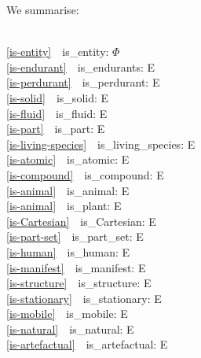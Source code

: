       
We summarise\footnotemark:

\sf
\begin{multicols}{3}\small
\bp
{}\\
\cref{is-entity}\ \ is\_entity: $\Phi$ {\RIGHTARROW}  \\
\cref{is-endurant}\ \ is\_endurants: E {\RIGHTARROW}  \\
\cref{is-perdurant}\ \ is\_perdurant: E {\RIGHTARROW}  \\
\cref{is-solid}\ \ is\_solid: E {\RIGHTARROW}  \\
\cref{is-fluid}\ \ is\_fluid: E {\RIGHTARROW}  \\
\cref{is-part}\ \ is\_part: E {\RIGHTARROW}  \\
\cref{is-living-species}\ \ is\_living\_species: E {\RIGHTARROW}  \\
\cref{is-atomic}\ \ is\_atomic: E {\RIGHTARROW}  \\
\cref{is-compound}\ \ is\_compound: E {\RIGHTARROW}  \\
\cref{is-animal}\ \ is\_animal: E {\RIGHTARROW}  \\
\cref{is-animal}\ \ is\_plant: E {\RIGHTARROW}  \\
\cref{is-Cartesian}\ \ is\_Cartesian: E {\RIGHTARROW}  \\
\cref{is-part-set}\ \ is\_part\_set: E {\RIGHTARROW}  \\
\cref{is-human}\ \ is\_human: E {\RIGHTARROW}  \\
\cref{is-manifest}\ \ is\_manifest: E {\RIGHTARROW}  \\
\cref{is-structure}\ \ is\_structure: E {\RIGHTARROW}  \\
\cref{is-stationary}\ \ is\_stationary: E {\RIGHTARROW}  \\
\cref{is-mobile}\ \ is\_mobile: E {\RIGHTARROW}  \\
\cref{is-natural}\ \ is\_natural: E {\RIGHTARROW}  \\
\cref{is-artefactual}\ \ is\_artefactual: E {\RIGHTARROW}  
\ep
\end{multicols}\normalsize 
